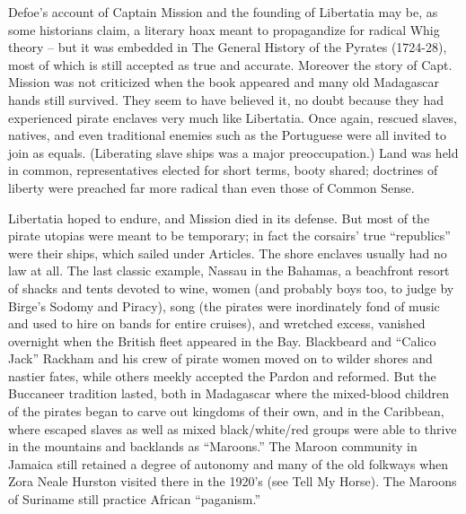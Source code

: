 \documentclass[a4paper,english,10pt,twoside]{article}
\begin{document}
\medskip
Defoe's account of Captain Mission and the founding of Libertatia may be, as some historians claim, a literary hoax meant to propagandize for radical Whig theory -- but it was embedded in The General History of the Pyrates (1724-28), most of which is still accepted as true and accurate. Moreover the story of Capt. Mission was not criticized when the book appeared and many old Madagascar hands still survived. They seem to have believed it, no doubt because they had experienced pirate enclaves very much like Libertatia. Once again, rescued slaves, natives, and even traditional enemies such as the Portuguese were all invited to join as equals. (Liberating slave ships was a major preoccupation.) Land was held in common, representatives elected for short terms, booty shared; doctrines of liberty were preached far more radical than even those of Common Sense.

\medskip
Libertatia hoped to endure, and Mission died in its defense. But most of the pirate utopias were meant to be temporary; in fact the corsairs' true \enquote{republics} were their ships, which sailed under Articles. The shore enclaves usually had no law at all. The last classic example, Nassau in the Bahamas, a beachfront resort of shacks and tents devoted to wine, women (and probably boys too, to judge by Birge's Sodomy and Piracy), song (the pirates were inordinately fond of music and used to hire on bands for entire cruises), and wretched excess, vanished overnight when the British fleet appeared in the Bay. Blackbeard and \enquote{Calico Jack} Rackham and his crew of pirate women moved on to wilder shores and nastier fates, while others meekly accepted the Pardon and reformed. But the Buccaneer tradition lasted, both in Madagascar where the mixed-blood children of the pirates began to carve out kingdoms of their own, and in the Caribbean, where escaped slaves as well as mixed black/white/red groups were able to thrive in the mountains and backlands as \enquote{Maroons.} The Maroon community in Jamaica still retained a degree of autonomy and many of the old folkways when Zora Neale Hurston visited there in the 1920's (see Tell My Horse). The Maroons of Suriname still practice African \enquote{paganism.}
\end{document}
